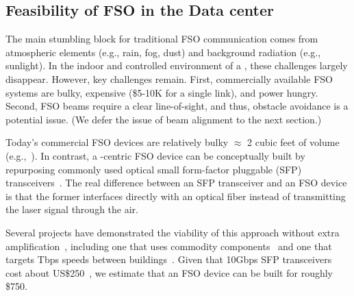 \subsection{Feasibility of FSO in the Data center} 

The main stumbling block for traditional FSO communication comes from
atmospheric elements (e.g., rain, fog, dust) and background radiation (e.g.,
sunlight).  In the indoor and controlled environment of a \DC, these
challenges largely disappear. 
%
However, key challenges remain.  First, commercially available FSO systems are
bulky, expensive (\$5-10K for a single link), and power hungry.  
%
Second, FSO beams require a clear line-of-sight, and thus, obstacle avoidance
is a potential issue. (We defer the issue of beam alignment to the next
section.)

 Today's commercial FSO devices are
relatively bulky $\approx$ 2 cubic feet of volume
(e.g.,~\cite{lightpointe}).
%
In contrast, a \DC-centric FSO
  device can be conceptually built by repurposing  
  commonly used optical small form-factor
  pluggable (SFP) transceivers~\cite{sfp}.  %
 The real difference between an  SFP transceiver and an
  FSO device is that the former interfaces directly with an optical fiber instead
  of transmitting the laser signal through the air. 
  
  Several projects have demonstrated the viability of this approach without
extra
amplification~\cite{tsujimura2008trans,mustafa2013reintroducing,yoshida2013focus},
including one that uses commodity components~\cite{mustafa2013reintroducing} and one that targets Tbps speeds between
buildings~\cite{ciaramella2009terabit}.
  Given that 10Gbps SFP transceivers  cost about US\$250~\cite{sfp}, we
estimate that an FSO device can be built for roughly \$750. 
  
